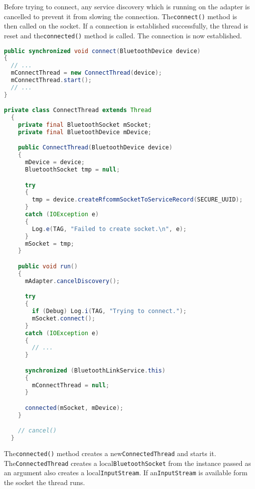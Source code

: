 \documentclass[11pt, a4paper, oneside, english]{scrbook}
\begin{document}
Before trying to connect, any service discovery which is running on the adapter is cancelled to prevent it from slowing the connection. The\lstinline{connect()} method is then called on the socket. If a connection is established successfully, the thread is reset and the\lstinline{connected()} method is called. The connection is now established.
\begin{lstlisting}[language=Java, numbers=none]
public synchronized void connect(BluetoothDevice device)
{
  // ...
  mConnectThread = new ConnectThread(device);
  mConnectThread.start();
  // ...  
}

private class ConnectThread extends Thread
  {
    private final BluetoothSocket mSocket;
    private final BluetoothDevice mDevice;

    public ConnectThread(BluetoothDevice device)
    {
      mDevice = device;
      BluetoothSocket tmp = null;

      try
      {
        tmp = device.createRfcommSocketToServiceRecord(SECURE_UUID);
      }
      catch (IOException e)
      {
        Log.e(TAG, "Failed to create socket.\n", e);
      }
      mSocket = tmp;
    }

    public void run()
    {
      mAdapter.cancelDiscovery();

      try
      {
        if (Debug) Log.i(TAG, "Trying to connect.");
        mSocket.connect();
      }
      catch (IOException e)
      {
        // ...
      }

      synchronized (BluetoothLinkService.this)
      {
        mConnectThread = null;
      }

      connected(mSocket, mDevice);
    }

    // cancel()
  }
\end{lstlisting}
The\lstinline{connected()} method creates a new\lstinline{ConnectedThread} and starts it. The\lstinline{ConnectedThread} creates a local\lstinline{BluetoothSocket} from the instance passed as an argument also creates a local\lstinline{InputStream}. If an\lstinline{InputStream} is available form the socket the thread runs.
\end{document}

